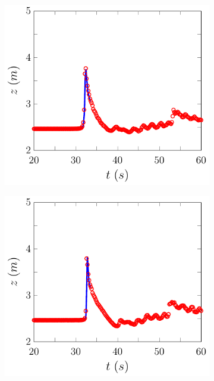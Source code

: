 \begin{figure}
	\centering
	\begin{subfigure}{0.5\textwidth}
		\includegraphics[width=\textwidth]{./chp6/figures/Experiment/Roeber/Trial8/FDVM/WG7-figure0.pdf}
		\vspace{0.5cm}
	\end{subfigure}%
	\begin{subfigure}{0.5\textwidth}
		\includegraphics[width=\textwidth]{./chp6/figures/Experiment/Roeber/Trial8/FDVM/WG8-figure0.pdf}

\end{subfigure}
\end{figure}

